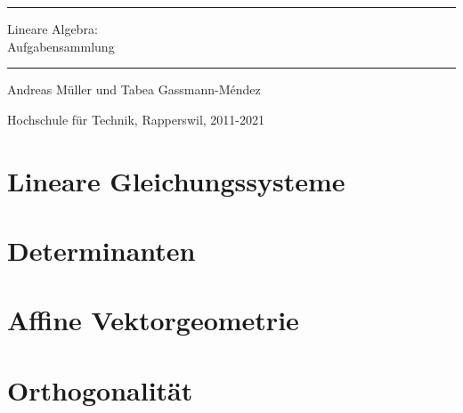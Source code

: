 \documentclass[a4paper,12pt]{book}
\begin{document}
\pagestyle{fancy}
\rhead{}
\frontmatter
\newcommand\HRule{\noindent\rule{\linewidth}{1.5pt}}
\begin{titlepage}
\HRule
\vspace*{2pt}
\begin{flushright}
{\Huge
Lineare Algebra:\\
\bigskip
Aufgabensammlung}
\end{flushright}
\HRule
\begin{flushright}
\vspace{30pt}
\LARGE
Andreas Müller
und
Tabea Gassmann-Méndez
\end{flushright}
\begin{center}
Hochschule für Technik, Rapperswil, 2011-2021
\end{center}
\end{titlepage}
\tableofcontents
\newenvironment{beispiel}[1][Beispiel]{%
\begin{proof}[#1]%
\renewcommand{\qedsymbol}{$\bigcirc$}
}{\end{proof}}
\mainmatter
\makeatletter
\newcommand{\customlabel}[2]{%
\protected@write \@auxout {}{\string \newlabel {#1}{{#2}{}{}{}{}}}}
\makeatother

\def\gaussurl#1{
\edef\glnumber{\getrefnumber{#1}}
\url{https://linalg.ch/gauss/?id=\glnumber}}
%


\openthemaindex
{}
\allowdisplaybreaks
\chapter{Lineare Gleichungssysteme}

\chapter{Determinanten}

\chapter{Affine Vektorgeometrie}

\chapter{Orthogonalität}

\end{document}

